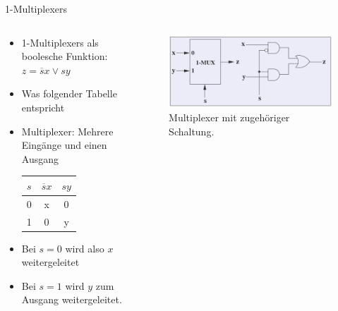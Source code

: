 \documentclass[12pt%
,xcolor=table
,aspectratio=169%
]{beamer}
\begin{document}
\begin{frame}{1-Multiplexers}
\begin{columns}[T] %
\begin{column}{.68\textwidth}
\begin{itemize}
	\item 1-Multiplexers als boolesche Funktion: $z = \overline{s}x \lor sy$
	\item Was folgender Tabelle entspricht
	\item Multiplexer: Mehrere Eingänge und einen Ausgang
\begin{table}[]
\begin{tabular}{|c|c|c|}
\hline
 \textbf{$s$}& \textbf{$\overline{s}x$}  & \textbf{$sy$}  \\ \hline
0 & x & 0  \\ \hline
1 & 0  & y \\ \hline
\end{tabular}
\end{table}
	\item Bei $s=0$ wird also $x$ weitergeleitet 
	\item Bei $s=1$ wird $y$ zum Ausgang weitergeleitet.
\end{itemize}
\end{column}%
\hfill%
\begin{column}{.48\textwidth}
\centering
\begin{figure}
\includegraphics[scale=0.32]{pictures/mux1}
\caption{Multiplexer mit zugehöriger Schaltung.}
\end{figure}
\end{column}%
\end{columns}
\end{frame}
\end{document}
